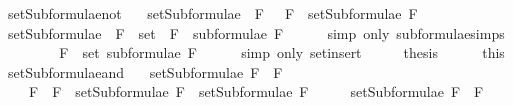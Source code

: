 \begin{isabellebody}
{\isafoldproof}%
%
\isadelimproof
\isanewline
%
\endisadelimproof
\isanewline
{}\isamarkupfalse%
\ setSubformulae{\isacharunderscore}not{\isacharcolon}\isanewline
\ \ \ {\isachardoublequoteopen}setSubformulae\ {\isacharparenleft}\isactrlbold {\isasymnot}\ F{\isacharparenright}\ {\isacharequal}\ {\isacharbraceleft}\isactrlbold {\isasymnot}\ F{\isacharbraceright}\ {\isasymunion}\ setSubformulae\ F{\isachardoublequoteclose}\isanewline
%
\isadelimproof
%
\endisadelimproof
%
\isatagproof
{}\isamarkupfalse%
\ {\isacharminus}\isanewline
\ \ \isamarkupfalse%
\ {\isachardoublequoteopen}setSubformulae\ {\isacharparenleft}\isactrlbold {\isasymnot}\ F{\isacharparenright}\ {\isacharequal}\ set\ {\isacharparenleft}\isactrlbold {\isasymnot}\ F\ {\isacharhash}\ subformulae\ F{\isacharparenright}{\isachardoublequoteclose}\isanewline
\ \ \ \ \isamarkupfalse%
\ {\isacharparenleft}simp\ only{\isacharcolon}\ subformulae{\isachardot}simps{\isacharparenleft}{}{\isacharparenright}{\isacharparenright}\isanewline
\ \ \isamarkupfalse%
\ \isamarkupfalse%
\ {\isachardoublequoteopen}{\isasymdots}\ {\isacharequal}\ {\isacharbraceleft}\isactrlbold {\isasymnot}\ F{\isacharbraceright}\ {\isasymunion}\ set\ {\isacharparenleft}subformulae\ F{\isacharparenright}{\isachardoublequoteclose}\isanewline
\ \ \ \ \isamarkupfalse%
\ {\isacharparenleft}simp\ only{\isacharcolon}\ set{\isacharunderscore}insert{\isacharparenright}\isanewline
\ \ \isamarkupfalse%
\ \isamarkupfalse%
\ {\isacharquery}thesis\isanewline
\ \ \ \ \isamarkupfalse%
\ this\isanewline
{}\isamarkupfalse%
%
\endisatagproof
{\isafoldproof}%
%
\isadelimproof
\isanewline
%
\endisadelimproof
\isanewline
{}\isamarkupfalse%
\ setSubformulae{\isacharunderscore}and{\isacharcolon}\ \isanewline
\ \ {\isachardoublequoteopen}setSubformulae\ {\isacharparenleft}F{}\ \isactrlbold {\isasymand}\ F{}{\isacharparenright}\ \isanewline
\ \ \ {\isacharequal}\ {\isacharbraceleft}F{}\ \isactrlbold {\isasymand}\ F{}{\isacharbraceright}\ {\isasymunion}\ {\isacharparenleft}setSubformulae\ F{}\ {\isasymunion}\ setSubformulae\ F{}{\isacharparenright}{\isachardoublequoteclose}\isanewline
%
\isadelimproof
%
\endisadelimproof
%
\isatagproof
{}\isamarkupfalse%
\ {\isacharminus}\isanewline
\ \ \isamarkupfalse%
\ {\isachardoublequoteopen}setSubformulae\ {\isacharparenleft}F{}\ \isactrlbold {\isasymand}\ F{}{\isacharparenright}\ \isanewline

\end{isabellebody}
